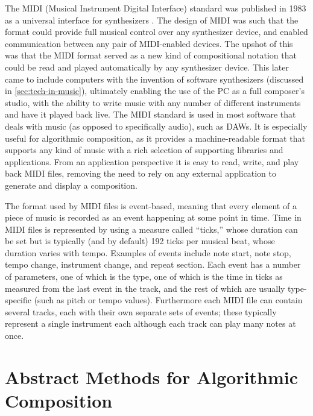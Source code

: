 \documentclass[ author={Stephen Livermore-Tozer},
				supervisor={Dr. Peter Flach},
				degree={MEng},
				title={Algorithmic Co-composition Using Machine Learning},
				subtitle={},
				type={research},
				year={2016} ]{dissertation}
\begin{document}
	The MIDI (Musical Instrument Digital Interface) standard was published in 1983 as a universal interface for synthesizers  \cite{swift1997brief}. The design of MIDI was such that the format could provide full musical control over any synthesizer device, and enabled communication between any pair of MIDI-enabled devices. The upshot of this was that the MIDI format served as a new kind of compositional notation that could be read and played automatically by any synthesizer device. This later came to include computers with the invention of software synthesizers (discussed in \ref{sec:tech-in-music}), ultimately enabling the use of the PC as a full composer's studio, with the ability to write music with any number of different instruments and have it played back live. 
	The MIDI standard is used in most software that deals with music (as opposed to specifically audio), such as DAWs. It is especially useful for algorithmic composition, as it provides a machine-readable format that supports any kind of music with a rich selection of supporting libraries and applications. From an application perspective it is easy to read, write, and play back MIDI files, removing the need to rely on any external application to generate and display a composition. 
	
	The format used by MIDI files is event-based, meaning that every element of a piece of music is recorded as an event happening at some point in time. Time in MIDI files is represented by using a measure called ``ticks,'' whose duration can be set but is typically (and by default) 192 ticks per musical beat, whose duration varies with tempo. Examples of events include note start, note stop, tempo change, instrument change, and repeat section. Each event has a number of parameters, one of which is the type, one of which is the time in ticks as measured from the last event in the track, and the rest of which are usually type-specific (such as pitch or tempo values). Furthermore each MIDI file can contain several tracks, each with their own separate sets of events; these typically represent a single instrument each although each track can play many notes at once. 
	
	\section{Abstract Methods for Algorithmic Composition}
	\label{sec:abstract-methods}
	
\end{document}
